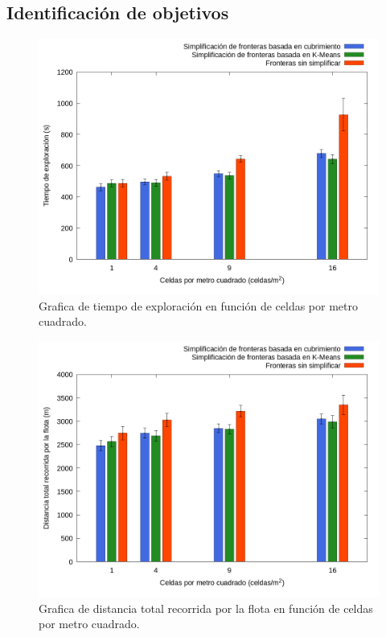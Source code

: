 \subsection{Identificación de objetivos}\label{sec:exp:idobj}



\begin{figure}[H]
  \centerfloat

  \includegraphics[clip=true, width=\graphlen]{imagenes/graficas_chicas/graficas_histo_num/ident_obj/exploration_time.png}

  \caption{Grafica de tiempo de exploración en función de celdas por metro cuadrado.}\label{fig:gra:idobj:et}

\end{figure}

\begin{figure}[H]
  \centerfloat

  \includegraphics[clip=true, width=\graphlen]{imagenes/graficas_chicas/graficas_histo_num/ident_obj/exploration_cost.png}

  \caption{Grafica de distancia total recorrida por la flota en función de celdas por metro cuadrado.}\label{fig:gra:idobj:ec}

\end{figure}

